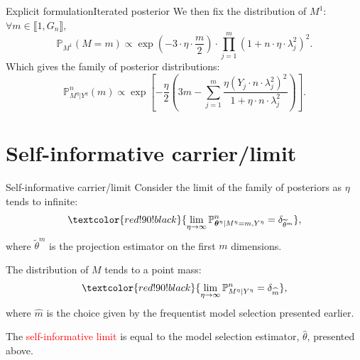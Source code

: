 \documentclass[10pt]{beamer}
\begin{document}
\begin{frame}{Explicit formulation}{Iterated posterior}
We then fix the distribution of $M^{1}$: $\forall m \in \llbracket 1, G_{n} \rrbracket, $
\[\mathbb{P}_{M^{1}}(M = m) \propto \exp\left(-3 \cdot \eta \cdot \frac{m}{2} \right) \cdot \prod\limits_{j = 1}^{m} \left(1 + n \cdot \eta \cdot \lambda_{j}^{2}\right)^{2}.\]
Which gives the family of posterior distributions:
\textcolor{red!90!black}{\[\mathbb{P}_{M^{\eta} \vert Y^{\eta}}^{n}(m) \propto \exp\!\!\left[- \frac{\eta}{2} \left( 3 m - \sum\limits_{j = 1}^{m} \frac{\eta\left(Y_{j} \cdot n \cdot \lambda_{j}^{2}\right)^{2}}{1 + \eta \cdot n \cdot \lambda_{j}^{2}} \right)\right].\]}
\end{frame}

\section{Self-informative carrier/limit}
\begin{frame}{Self-informative carrier/limit}
Consider the limit of the family of posteriors as $\eta$ tends to infinite:
\[\textcolor{red!90!black}{\lim_{\eta \rightarrow \infty} \mathbb{P}_{\boldsymbol{\theta}^{\eta} \vert M^{\eta} = m, Y^{\eta}}^{n} = \delta_{\widetilde{\theta}^{m}}},\]
where $\widetilde{\theta}^{m}$ is the projection estimator on the first $m$ dimensions.

The distribution of $M$ tends to a point mass:
\[\textcolor{red!90!black}{\lim_{\eta \rightarrow \infty} \mathbb{P}_{M^{\eta}\vert Y^{\eta}}^{n} = \delta_{\widehat{m}}},\]
where $\widehat{m}$ is the choice given by the frequentist model selection presented earlier.

\medskip

The \textcolor{red}{self-informative limit} is equal to the model selection estimator, $\widehat{\theta}$, presented above.
\end{frame}
\end{document}
